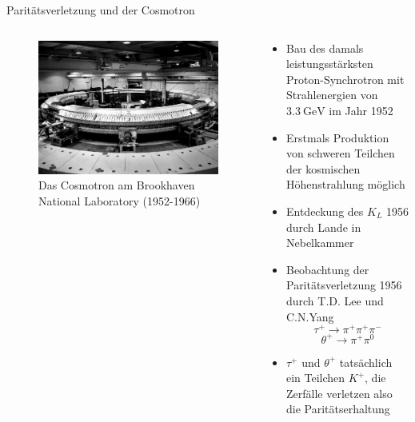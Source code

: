 \documentclass[aspectratio=1610, professionalfonts, 9pt, t]{beamer}
\begin{document}
  \begin{frame}{Paritätsverletzung und der Cosmotron}
    \begin{columns}[onlytextwidth]
      \begin{column}{0.4\textwidth}
        \begin{figure}[ht]
          \begin{center}
            \includegraphics[height=0.6\textheight]{Images/cosmotron.jpg} %
            \caption{Das Cosmotron am Brookhaven National Laboratory (1952-1966)}
          \end{center}
        \end{figure}
      \end{column}
      \begin{column}{0.5\textwidth}
        \begin{itemize}
          \item Bau des damals leistungsstärksten Proton-Synchrotron mit Strahlenergien von $\SI{3.3}{\giga\electronvolt}$ im Jahr 1952
          \item Erstmals Produktion von schweren Teilchen der kosmischen Höhenstrahlung möglich
          \item Entdeckung des $K_{L}$ 1956 durch Lande in Nebelkammer
          \item Beobachtung der Paritätsverletzung 1956 durch T.D. Lee und C.N.Yang
          \begin{equation*}
            \tau^{+} \rightarrow \pi^{+} \pi^{+} \pi^{-}
          \end{equation*}
          \begin{equation*}
            \theta^{+} \rightarrow \pi^{+} \pi^{0}
          \end{equation*}
          \item $\tau^{+}$ und $\theta^{+}$ tatsächlich ein Teilchen $K^{+}$, die Zerfälle verletzen also die Paritätserhaltung
        \end{itemize}
      \end{column}
    \end{columns}
  \end{frame}
\end{document}

